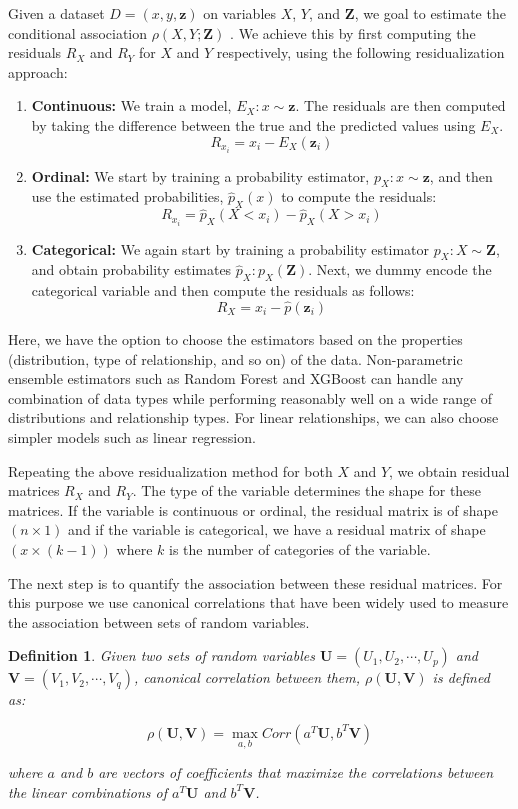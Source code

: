 \documentclass{uai2025} %
\newtheorem{definition}{Definition}
\begin{document}
Given a dataset $ D = (x, y, \bm{z}) $ on variables $ X $, $ Y $, and $ \bm{Z}
$, we goal to estimate the conditional association $ \rho(X, Y; \bm{Z}) $ . We
achieve this by first computing the residuals $ R_X $ and $ R_Y $ for $ X $ 
and $ Y $ respectively, using the following residualization approach:

\begin{enumerate}
	\item \textbf{Continuous:} We train a model, $ E_X: x \sim
		\bm{z} $. The residuals are then computed by taking the difference
		between the true and the predicted values using $ E_X $. 
		$$ R_{x_i} = x_i - E_X(\bm{z}_i) $$
	\item \textbf{Ordinal:} We start by training a probability estimator, $
		p_X: x \sim \bm{z} $, and then use the estimated probabilities, 
		$ \hat{p}_X(x) $ to compute the residuals:
		$$ R_{x_i} = \hat{p}_X(X < x_i) - \hat{p}_X(X > x_i) $$
	\item \textbf{Categorical:} We again start by training a probability
		estimator $ p_X: X \sim \bm{Z} $, and obtain probability
		estimates $ \hat{p}_X: p_X(\bm{Z}) $. Next, we dummy encode the
		categorical variable and then compute the residuals as follows: 
		$$ R_X = x_i - \hat{p}(\bm{z}_i) $$
\end{enumerate}

Here, we have the option to choose the estimators based on the properties
(distribution, type of relationship, and so on) of the data. Non-parametric
ensemble estimators such as Random Forest and XGBoost can handle any
combination of data types while performing reasonably well on a wide range of
distributions and relationship types. For linear relationships, we can also
choose simpler models such as linear regression.

Repeating the above residualization method for both $ X $ and  $ Y $, we obtain
residual matrices $ R_X $ and $ R_Y $. The type of the variable determines the
shape for these matrices. If the variable is continuous or ordinal, the
residual matrix is of shape $ ( n \times 1 ) $ and if the variable is
categorical, we have a residual matrix of shape $ ( x \times (k-1)) $ where $ k
$ is the number of categories of the variable. 

The next step is to quantify the association between these residual matrices.
For this purpose we use canonical correlations that have been widely used to
measure the association between sets of random variables.

\begin{definition} 

	Given two sets of random variables $ \bm{U} = (U_1, U_2, \cdots, U_p) $
	and $ \bm{V} = (V_1, V_2, \cdots, V_q) $, canonical correlation between
	them, $\rho(\bm{U}, \bm{V}) $ is defined as:
		
	\begin{equation}
		\rho(\bm{U}, \bm{V}) = \max_{a, b} Corr(a^T \bm{U}, b^T \bm{V})
	\end{equation}

	where $ a $ and $ b $ are vectors of coefficients that maximize the correlations
	between the linear combinations of $ a^T \bm{U} $ and $ b^T \bm{V} $.
\end{definition}
\end{document}
